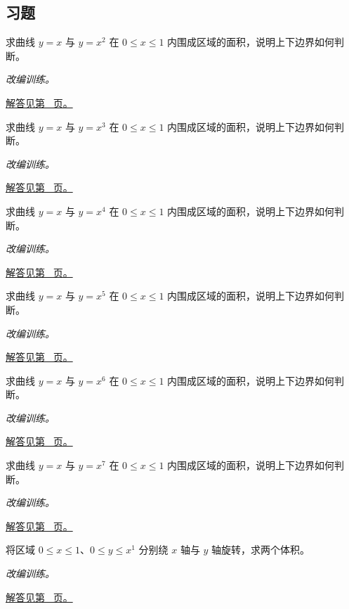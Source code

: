 \documentclass[12pt,fontset=fandol]{ctexart}
\begin{document}
\subsection{习题}
\begin{example}[两条幂曲线之间的面积]\label{ex:c21q1}
求曲线 $y=x$ 与 $y=x^{2}$ 在 $0\le x\le1$ 内围成区域的面积，说明上下边界如何判断。
\par\textit{改编训练。}\par\hyperref[ans:c21q1]{解答见第~\pageref{ans:c21q1} 页。}
\end{example}
\begin{example}[两条幂曲线之间的面积]\label{ex:c21q2}
求曲线 $y=x$ 与 $y=x^{3}$ 在 $0\le x\le1$ 内围成区域的面积，说明上下边界如何判断。
\par\textit{改编训练。}\par\hyperref[ans:c21q2]{解答见第~\pageref{ans:c21q2} 页。}
\end{example}
\begin{example}[两条幂曲线之间的面积]\label{ex:c21q3}
求曲线 $y=x$ 与 $y=x^{4}$ 在 $0\le x\le1$ 内围成区域的面积，说明上下边界如何判断。
\par\textit{改编训练。}\par\hyperref[ans:c21q3]{解答见第~\pageref{ans:c21q3} 页。}
\end{example}
\begin{example}[两条幂曲线之间的面积]\label{ex:c21q4}
求曲线 $y=x$ 与 $y=x^{5}$ 在 $0\le x\le1$ 内围成区域的面积，说明上下边界如何判断。
\par\textit{改编训练。}\par\hyperref[ans:c21q4]{解答见第~\pageref{ans:c21q4} 页。}
\end{example}
\begin{example}[两条幂曲线之间的面积]\label{ex:c21q5}
求曲线 $y=x$ 与 $y=x^{6}$ 在 $0\le x\le1$ 内围成区域的面积，说明上下边界如何判断。
\par\textit{改编训练。}\par\hyperref[ans:c21q5]{解答见第~\pageref{ans:c21q5} 页。}
\end{example}
\begin{example}[两条幂曲线之间的面积]\label{ex:c21q6}
求曲线 $y=x$ 与 $y=x^{7}$ 在 $0\le x\le1$ 内围成区域的面积，说明上下边界如何判断。
\par\textit{改编训练。}\par\hyperref[ans:c21q6]{解答见第~\pageref{ans:c21q6} 页。}
\end{example}
\begin{example}[同一区域绕不同轴旋转]\label{ex:c21q7}
将区域 $0\le x\le1$、$0\le y\le x^{1}$ 分别绕 $x$ 轴与 $y$ 轴旋转，求两个体积。
\par\textit{改编训练。}\par\hyperref[ans:c21q7]{解答见第~\pageref{ans:c21q7} 页。}
\end{example}
\end{document}
